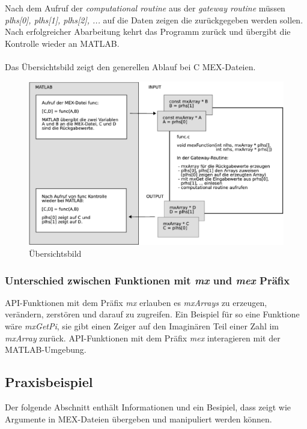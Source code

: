 \documentclass[a4paper,11pt]{article}
\begin{document}
Nach dem Aufruf der \textit{computational routine} aus der
\textit{gateway routine} müssen \textit{plhs[0], plhs[1], plhs[2], ...}
auf die Daten zeigen die zurückgegeben werden sollen.
Nach erfolgreicher Abarbeitung kehrt das Programm
zurück und übergibt die Kontrolle wieder an MATLAB.\\\\
Das Übersichtsbild zeigt den generellen Ablauf bei C MEX-Dateien.\\
\begin{figure}[ht]
\begin{center}
\includegraphics[width=14cm]{matlab-mex.eps}
\caption{Übersichtsbild}
\end{center}
\end{figure}

\subsubsection*{Unterschied zwischen Funktionen mit \textit{mx} und \textit{mex}
Präfix} 
API-Funktionen mit dem Präfix \textit{mx} erlauben es \textit{mxArrays} zu
erzeugen, verändern, zerstören und darauf zu zugreifen. Ein Beispiel für so eine
Funktione wäre \textit{mxGetPi}, sie gibt einen Zeiger auf den Imaginären
Teil einer Zahl im \textit{mxArray} zurück. API-Funktionen mit dem Präfix
\textit{mex} interagieren mit der MATLAB-Umgebung.

\subsection{Praxisbeispiel}
Der folgende Abschnitt enthält Informationen und ein Besipiel,
dass zeigt wie Argumente in MEX-Dateien übergeben und
manipuliert werden können.
\end{document}
